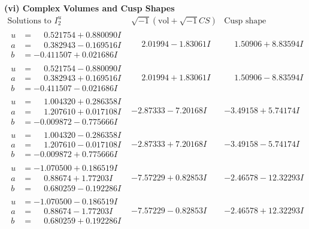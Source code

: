 \documentclass[1p]{elsarticle_modified}
\theoremstyle{definition}
\newcommand{\I}{\sqrt{-1}}
\begin{document}
\newpage\flushleft \textbf{(vi) Complex Volumes and Cusp Shapes}
$$\begin{array}{c|c|c}  
\text{Solutions to }I^u_{2}& \I (\text{vol} + \sqrt{-1}CS) & \text{Cusp shape}\\
 \hline 
\begin{aligned}
u &= \phantom{-}0.521754 + 0.880090 I \\
a &= \phantom{-}0.382943 - 0.169516 I \\
b &= -0.411507 + 0.021686 I\end{aligned}
 & \phantom{-}2.01994 - 1.83061 I & \phantom{-}1.50906 + 8.83594 I \\ \hline\begin{aligned}
u &= \phantom{-}0.521754 - 0.880090 I \\
a &= \phantom{-}0.382943 + 0.169516 I \\
b &= -0.411507 - 0.021686 I\end{aligned}
 & \phantom{-}2.01994 + 1.83061 I & \phantom{-}1.50906 - 8.83594 I \\ \hline\begin{aligned}
u &= \phantom{-}1.004320 + 0.286358 I \\
a &= \phantom{-}1.207610 + 0.017108 I \\
b &= -0.009872 - 0.775666 I\end{aligned}
 & -2.87333 - 7.20168 I & -3.49158 + 5.74174 I \\ \hline\begin{aligned}
u &= \phantom{-}1.004320 - 0.286358 I \\
a &= \phantom{-}1.207610 - 0.017108 I \\
b &= -0.009872 + 0.775666 I\end{aligned}
 & -2.87333 + 7.20168 I & -3.49158 - 5.74174 I \\ \hline\begin{aligned}
u &= -1.070500 + 0.186519 I \\
a &= \phantom{-}0.88674 + 1.77203 I \\
b &= \phantom{-}0.680259 - 0.192286 I\end{aligned}
 & -7.57229 + 0.82853 I & -2.46578 - 12.32293 I \\ \hline\begin{aligned}
u &= -1.070500 - 0.186519 I \\
a &= \phantom{-}0.88674 - 1.77203 I \\
b &= \phantom{-}0.680259 + 0.192286 I\end{aligned}
 & -7.57229 - 0.82853 I & -2.46578 + 12.32293 I \\ \hline\begin{aligned}

\end{aligned}
\end{array}$$
\end{document}
